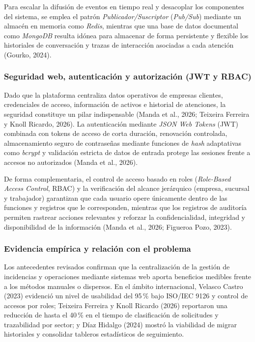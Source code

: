 Para escalar la difusión de eventos en tiempo real y desacoplar los componentes del sistema, se emplea el patrón \textit{Publicador/Suscriptor} (\textit{Pub/Sub}) mediante un almacén en memoria como \textit{Redis}, mientras que una base de datos documental como \textit{MongoDB} resulta idónea para almacenar de forma persistente y flexible los historiales de conversación y trazas de interacción asociadas a cada atención (Gourko, 2024).

\subsubsection{Seguridad web, autenticación y autorización (JWT y RBAC)}
Dado que la plataforma centraliza datos operativos de empresas clientes, credenciales de acceso, información de activos e historial de atenciones, la seguridad constituye un pilar indispensable (Manda et al., 2026; Teixeira Ferreira y Knoll Ricardo, 2026). La autenticación mediante \textit{JSON Web Tokens} (JWT) combinada con tokens de acceso de corta duración, renovación controlada, almacenamiento seguro de contraseñas mediante funciones de \textit{hash} adaptativas como \textit{bcrypt} y validación estricta de datos de entrada protege las sesiones frente a accesos no autorizados (Manda et al., 2026).

De forma complementaria, el control de acceso basado en roles (\textit{Role-Based Access Control}, RBAC) y la verificación del alcance jerárquico (empresa, sucursal y trabajador) garantizan que cada usuario opere únicamente dentro de las funciones y registros que le corresponden, mientras que los registros de auditoría permiten rastrear acciones relevantes y reforzar la confidencialidad, integridad y disponibilidad de la información (Manda et al., 2026; Figueroa Pozo, 2023).

\subsubsection{Evidencia empírica y relación con el problema}
Los antecedentes revisados confirman que la centralización de la gestión de incidencias y operaciones mediante sistemas web aporta beneficios medibles frente a los métodos manuales o dispersos. En el ámbito internacional, Velasco Castro (2023) evidenció un nivel de usabilidad del 95\,\% bajo ISO/IEC 9126 y control de accesos por roles; Teixeira Ferreira y Knoll Ricardo (2026) reportaron una reducción de hasta el 40\,\% en el tiempo de clasificación de solicitudes y trazabilidad por sector; y Díaz Hidalgo (2024) mostró la viabilidad de migrar historiales y consolidar tableros estadísticos de seguimiento.

